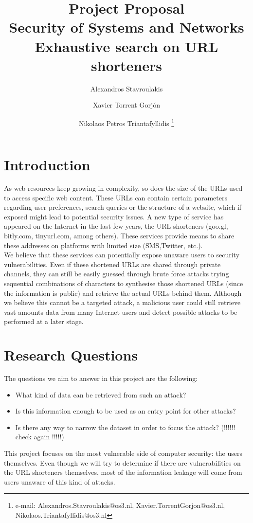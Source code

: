 \documentclass{article}
\author{Alexandros Stavroulakis%
}
\author{Xavier Torrent Gorj\'{o}n%
}
\author{Nikolaos Petros Triantafyllidis%
  \thanks{e-mail: Alexandros.Stavroulakis@os3.nl, Xavier.TorrentGorjon@os3.nl, Nikolaos.Triantafyllidis@os3.nl}}
\affil{University of Amsterdam, System and Network Engineering (MSc)}
\title{ Project Proposal \\ Security of Systems and Networks\\ Exhaustive search on URL shorteners}
\begin{document}
\maketitle


\section{Introduction}
As web resources keep growing in complexity, so does the size of the URLs used to access specific web content. These URLs can contain certain parameters regarding user preferences, search queries or the structure of a website, which if exposed might lead to potential security issues. A new type of service has appeared on the Internet in the last few years, the URL shorteners (goo.gl, bitly.com,  tinyurl.com, among others). These services provide means to share these addresses on platforms with limited size (SMS,Twitter, etc.). \\
We believe that these services can potentially expose unaware users to security vulnerabilities. Even if these shortened URLs are shared through private channels, they can still be easily guessed through brute force attacks trying sequential combinations of characters to synthesise those shortened URLs (since the information is public) and retrieve the actual URLs behind them. Although we believe this cannot be a targeted attack, a malicious user could still retrieve vast amounts data from many Internet users and detect possible attacks to be performed at a later stage. 


\section{Research Questions}

The questions we aim to answer in this project are the following:
\begin{itemize}
  \item What kind of data can be retrieved from such an attack? 
  \item Is this information enough to be used as an entry point for other attacks?
  \item Is there any way to narrow the dataset in order to focus the attack? (!!!!!! check again !!!!!) 
\end{itemize}
This project focuses on the most vulnerable side of computer security: the users themselves. Even though we will try to determine if there are vulnerabilities on the URL shorteners themselves, most of the information leakage will come from users unaware of this kind of attacks.
\end{document}
